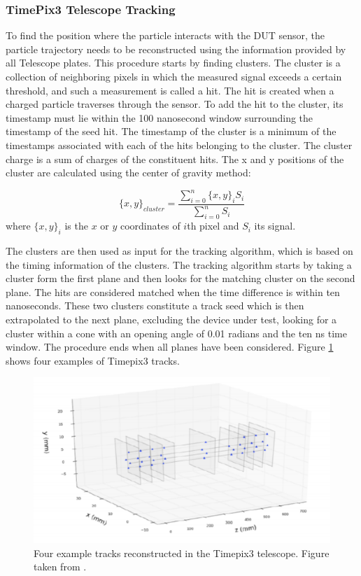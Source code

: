 \subsubsection{TimePix3 Telescope Tracking}

To find the position where the particle interacts with the DUT sensor, the particle trajectory needs to be reconstructed using the information provided by all Telescope plates. This procedure starts by finding clusters. The cluster is a collection of neighboring pixels in which the measured signal exceeds a certain threshold, and such a measurement is called a hit. The hit is created when a charged particle traverses through the sensor.  To add the hit to the cluster, its timestamp must lie within the 100 nanosecond window surrounding the timestamp of the seed hit. The timestamp of the cluster is a minimum of the timestamps associated with each of the hits belonging to the cluster. The cluster charge is a sum of charges of the constituent hits. 
The x and y positions of the cluster are calculated using the center of gravity method: 

\begin{equation}
    \{x,y\}_{cluster} = \frac{\sum_{i = 0}^{n} \{x,y\}_{i} S_{i}}{\sum_{i = 0}^{n} S_{i}} 
\end{equation}
where $\{x,y\}_{i} $ is the $x$ or $y$  coordinates of $i$th pixel and $S_i$ its signal. 

The clusters are then used as input for the tracking algorithm, which is based on the timing information of the clusters.  The tracking algorithm starts by taking a cluster form the first plane and then looks for the matching cluster on the second plane. The hits are considered matched when the time difference is within ten nanoseconds. These two clusters constitute a track seed which is then extrapolated to the next plane, excluding the device under test, looking for a cluster within a cone with an opening angle of 0.01 radians and the ten ns time window. The procedure ends when all planes have been considered. Figure \ref{fig:telescope_tracks} shows four examples of Timepix3 tracks. 



\begin{figure}
\centering
\includegraphics[scale=0.9]{figures/telescope_tracks.png}
\caption{Four example tracks reconstructed in the Timepix3 telescope. Figure taken from \cite{Sophie}.}
\label{fig:telescope_tracks}
\end{figure}


